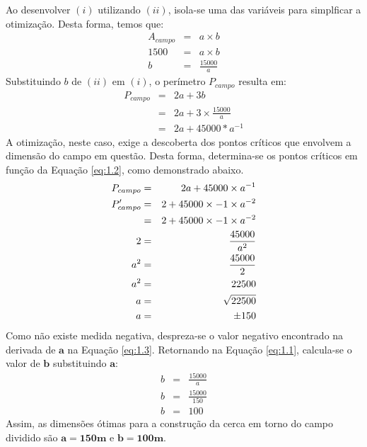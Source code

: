 \documentclass{article}
\begin{document}
\par Ao desenvolver $(i)$ utilizando $(ii)$, isola-se uma das variáveis para simplficar a otimização. Desta forma, temos que:
\begin{eqnarray}
    \label{eq:1.1}
    A_{campo} & = &a \times b \nonumber\\
    1500 & = &a \times b \nonumber\\
    b & = &\frac{15000}{a}
\end{eqnarray}
Substituindo $b$ de $(ii)$ em $(i)$, o perímetro $P_{campo}$ resulta em:
\begin{eqnarray}
    \label{eq:1.2}
    P_{campo}   & = &2a + 3b \nonumber\\
    & = &2a + 3 \times \frac{15000}{a} \nonumber\\
    & = &2a + 45000*{a^{-1}}
\end{eqnarray}
A otimização, neste caso, exige a descoberta dos pontos críticos que envolvem a dimensão do campo em questão. Desta forma, determina-se os pontos críticos em função da Equação \ref{eq:1.2}, como demonstrado abaixo.
\begin{eqnarray}
    \label{eq:1.3}
    P_{campo}   & = & 2a + 45000 \times {a^{-1}} \nonumber\\
    P'_{campo}   & = & 2 + 45000 \times -1 \times a^{-2} \\
    & = & 2 + 45000 \times -1 \times a^{-2} \nonumber\\
    2 & = & 45000 \over a^{2} \nonumber\\
    a^{2} & = & 45000 \over 2 \nonumber\\
    a^{2} & = & 22500 \nonumber\\
    a & = & \sqrt[]{22500} \nonumber\\
    a & = & \pm 150 \nonumber
\end{eqnarray}
Como não existe medida negativa, despreza-se o valor negativo encontrado na derivada de $\mathbf{a}$ na Equação \ref{eq:1.3}.
Retornando na Equação \ref{eq:1.1}, calcula-se o valor de $\mathbf{b}$ substituindo $\mathbf{a}$:
\begin{eqnarray}
    \label{eq:1.4}
    b & = &\frac{15000}{a} \nonumber\\
    b & = &\frac{15000}{150} \nonumber\\
    b & = &100 \nonumber
\end{eqnarray}
Assim, as dimensões ótimas para a construção da cerca em torno do campo dividido são $\mathbf{a = 150m}$ e $\mathbf{b = 100m}$.
\end{document}
